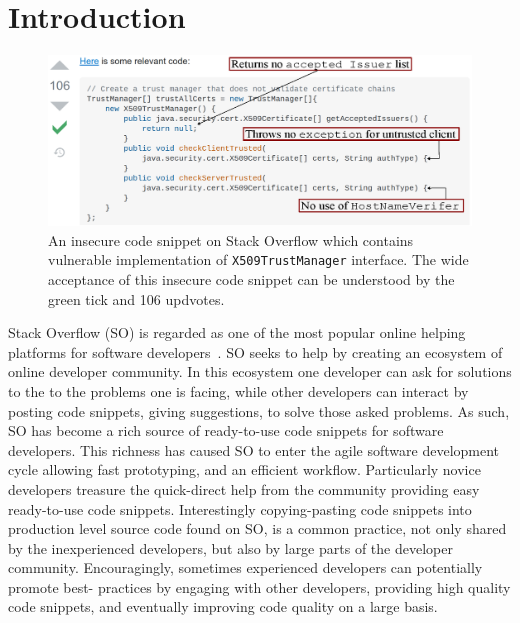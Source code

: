 \section{Introduction}
   \label{into}

   \begin{figure}
   \includegraphics[width=\linewidth]{Figures/SO_ss.eps}
   \caption{An  insecure code snippet on Stack Overflow which contains vulnerable implementation of \texttt{X509TrustManager} interface. 
   The wide acceptance of this insecure code snippet can be understood by the green tick and 106 updvotes.}
   \label{fig:SO_screenshot}
   \end{figure}
   
   Stack Overflow (SO) is regarded as one of the most popular online helping platforms for software developers~\cite{8816778}. 
   SO seeks to help by creating an ecosystem of online developer community. 
   In this ecosystem one developer can ask for solutions to the to the problems one is facing, while other developers can 
   interact by posting code snippets, giving suggestions, to solve those asked problems. 
   As such, SO has become a rich source of ready-to-use code snippets for software developers. 
   This richness has caused SO to enter the agile software development cycle allowing fast prototyping, and an efficient workflow. 
   Particularly novice developers treasure the quick-direct help from the community providing easy ready-to-use code snippets.
   Interestingly copying-pasting code snippets into production level source code found on SO, is a common practice, 
   not only shared by the inexperienced developers, but also by large parts of the developer community. 
   Encouragingly, sometimes experienced developers can potentially promote best- practices by engaging with other developers, 
   providing high quality code snippets, and eventually improving code quality on a large basis.

